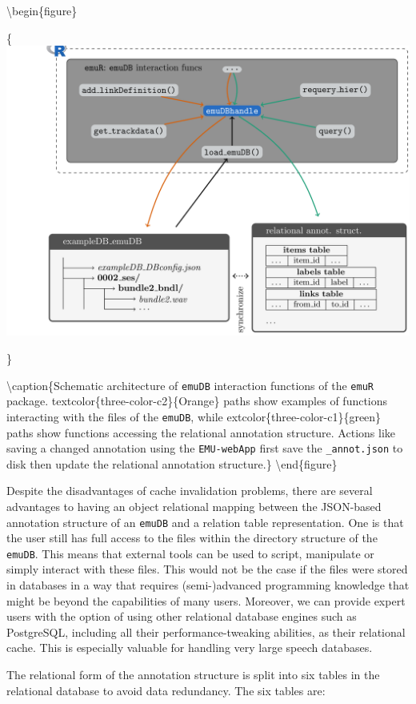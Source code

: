 \documentclass[]{book}
\theoremstyle{definition}
\theoremstyle{definition}
\theoremstyle{definition}
\theoremstyle{remark}
\begin{document}
\textbackslash{}begin\{figure\}

\{\centering \includegraphics[width=0.75\linewidth]{pics/emuRstruct}

\}

\textbackslash{}caption\{Schematic architecture of \texttt{emuDB}
interaction functions of the \texttt{emuR} package.
textcolor\{three-color-c2\}\{Orange\} paths show examples of functions
interacting with the files of the \texttt{emuDB}, while
extcolor\{three-color-c1\}\{green\} paths show functions accessing the
relational annotation structure. Actions like saving a changed
annotation using the \texttt{EMU-webApp} first save the
\texttt{\_annot.json} to disk then update the relational annotation
structure.\}\label{fig:query-schematic-emuR-structure}
\textbackslash{}end\{figure\}

Despite the disadvantages of cache invalidation problems, there are
several advantages to having an object relational mapping between the
JSON-based annotation structure of an \texttt{emuDB} and a relation
table representation. One is that the user still has full access to the
files within the directory structure of the \texttt{emuDB}. This means
that external tools can be used to script, manipulate or simply interact
with these files. This would not be the case if the files were stored in
databases in a way that requires (semi-)advanced programming knowledge
that might be beyond the capabilities of many users. Moreover, we can
provide expert users with the option of using other relational database
engines such as PostgreSQL, including all their performance-tweaking
abilities, as their relational cache. This is especially valuable for
handling very large speech databases.

The relational form of the annotation structure is split into six tables
in the relational database to avoid data redundancy. The six tables are:
\end{document}
